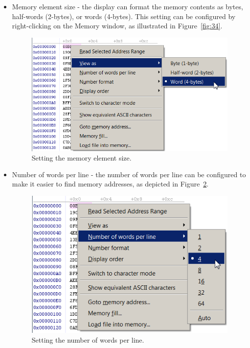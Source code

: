 \documentclass[11pt, twoside, pdftex]{article}
\begin{document}
\begin{itemize}
\item Memory element size - the display can format the memory
contents as bytes, half-words (2-bytes), or words (4-bytes).
This setting can be configured by right-clicking on the Memory
window, as illustrated in Figure~\ref{fig:34}.

\begin{figure}[H]
   \begin{center}
      \includegraphics[scale=1]{screenshots/figure40.png}
   \end{center}
   \caption{Setting the memory element size.} 
	 \label{fig:40}
\end{figure}

\item Number of words per line - the number of words per line can
be configured to make it easier to find memory addresses, as
depicted in Figure~\ref{fig:41}.

\begin{figure}[H]
   \begin{center}
      \includegraphics[scale=1]{screenshots/figure41.png}
   \end{center}
   \caption{Setting the number of words per line.} 
	 \label{fig:41}
\end{figure}


\end{itemize}
\end{document}
